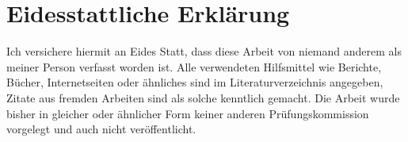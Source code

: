 \section{Eidesstattliche Erklärung}

Ich versichere hiermit an Eides Statt, dass diese Arbeit von niemand anderem als meiner Person verfasst worden ist.
Alle verwendeten Hilfsmittel wie Berichte, Bücher, Internetseiten oder ähnliches sind im Literaturverzeichnis angegeben,
Zitate aus fremden Arbeiten sind als solche kenntlich gemacht. Die Arbeit wurde bisher in gleicher oder ähnlicher Form
keiner anderen Prüfungskommission vorgelegt und auch nicht veröffentlicht.